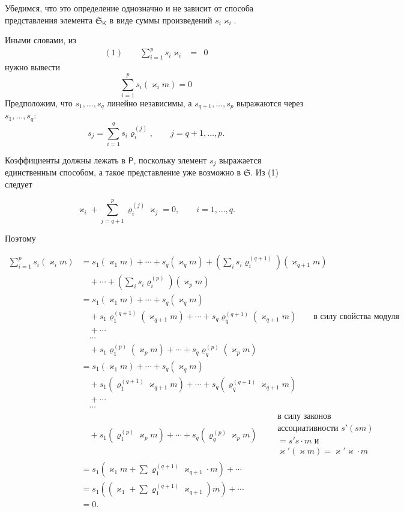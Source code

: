 \documentclass[11pt]{article}
\begin{document}
Убедимся, что это определение однозначно и не зависит от способа представления элемента \(\mathfrak S_{\mathsf K}\) в виде суммы произведений \(s_i\varkappa _i\).

Иными словами, из
\[
\begin{array}{rcl}
(1)\qquad \displaystyle\sum_{i=1}^{p}s_i\varkappa _i&=&0
\end{array}
\]
нужно вывести
\[
\sum_{i=1}^{p}s_i(\varkappa _i m)=0
\]
Предположим, что \(s_1,\ldots,s_q\) линейно независимы, а \(s_{q+1},\ldots,s_p\) выражаются через \(s_1,\ldots,s_q\):
\[
s_j=\sum_{i=1}^{q}s_i\varrho_i^{(j)},\qquad j=q+1,\ldots,p.
\]

Коэффициенты должны лежать в \(\mathsf P\), поскольку элемент \(s_j\) выражается единственным способом, а такое представление уже возможно в \(\mathfrak S\). Из (1) следует

\[
\varkappa _i+\sum_{j=q+1}^{p}\varrho_i^{(j)}\varkappa _j=0,\qquad i=1,\ldots,q.
\]

Поэтому

\[
\begin{aligned}
\sum_{i=1}^{p}s_i(\varkappa _i m)
&=s_1(\varkappa _1m)+\cdots+s_q(\varkappa _qm)
  +\left(\sum_i s_i\varrho_i^{(q+1)}\right)(\varkappa _{q+1}m)\\
&\quad+\cdots+\left(\sum_i s_i\varrho_i^{(p)}\right)(\varkappa _pm)\\
&=s_1(\varkappa _1m)+\cdots+s_q(\varkappa _qm)\\
&\quad+s_1\varrho_1^{(q+1)}(\varkappa _{q+1}m)+\cdots+s_q\varrho_q^{(q+1)}(\varkappa _{q+1}m)
  \qquad\text{в силу свойства модуля}\\
&\quad+\cdots\\
&\quad\cdots\\
&\quad+s_1\varrho_1^{(p)}(\varkappa _pm)+\cdots+s_q\varrho_q^{(p)}(\varkappa _pm)\\
&=s_1(\varkappa _1m)+\cdots+s_q(\varkappa _qm)\\
&\quad+s_1(\varrho_1^{(q+1)}\varkappa _{q+1}m)+\cdots+s_q(\varrho_q^{(q+1)}\varkappa _{q+1}m)\\
&\quad+\cdots\\
&\quad\cdots\\
&\quad+s_1(\varrho_1^{(p)}\varkappa _pm)+\cdots+s_q(\varrho_q^{(p)}\varkappa _pm)
  \qquad\begin{gathered}\text{в силу законов}\\ \text{ассоциативности }s'(sm)\\ =s's\cdot m\text{ и}\\ \varkappa '(\varkappa m)=\varkappa '\varkappa \cdot m\end{gathered}\\
&=s_1\left(\varkappa _1m+\sum\varrho_1^{(q+1)}\varkappa _{q+1}\cdot m\right)+\cdots\\
&=s_1\left(\left(\varkappa _1+\sum\varrho_1^{(q+1)}\varkappa _{q+1}\right)m\right)+\cdots\\
&=0.
\end{aligned}
\]
\end{document}

